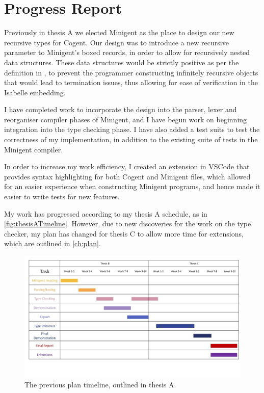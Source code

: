 \chapter{Progress Report}\label{ch:progress}

Previously in thesis A we elected Minigent as the place to design our new recursive types for Cogent.
Our design was to introduce a new recursive parameter to Minigent's boxed records, in order to allow
for recursively nested data structures. These data structures would be strictly positive as per the 
definition in , to prevent the programmer constructing infinitely recursive
objects that would lead to termination issues, thus allowing for ease of verification in
the Isabelle embedding.

I have completed work to incorporate the design into the parser, lexer and reorganiser compiler phases of
Minigent, and I have begun work on beginning integration into the type checking phase.
I have also added a test suits to test the correctness of my implementation, 
in addition to the existing suite of tests in the Minigent compiler.

In order to increase my work efficiency, I created an extension in VSCode that provides syntax highlighting
for both Cogent and Minigent files, which allowed for an easier experience when constructing Minigent programs,
and hence made it easier to write tests for new features.

My work has progressed according to my thesis A schedule, as in \autoref{fig:thesisATimeline}. However, due to 
new discoveries  for the work on the type checker, my plan has changed for 
thesis C to allow more time for extensions, which are outlined in \autoref{ch:plan}.

\begin{figure}
    \centering
    \includegraphics[width=\linewidth]{content/previous_plan.jpg}
    \caption{The previous plan timeline, outlined in thesis A.}
    \label{fig:thesisATimeline}
\end{figure}


